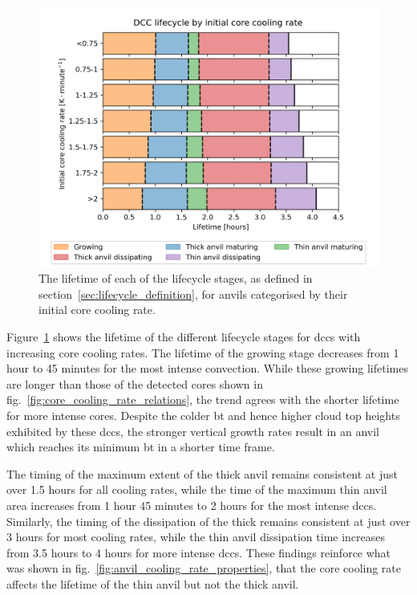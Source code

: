 \begin{figure}[tp]
    \centering
    \includegraphics[width=\textwidth]{figures/chapter3_09.png}
    \caption[
    The average lifetime of each lifecycle stage for anvils categorised by their initial core cooling rate
    ]{
    The lifetime of each of the lifecycle stages, as defined in section~\ref{sec:lifecycle_definition}, for anvils categorised by their initial core cooling rate.
    }
    \label{fig:anvil_cooling_rate_absolute_lifecycle}
\end{figure}

Figure~\ref{fig:anvil_cooling_rate_absolute_lifecycle} shows the lifetime of the different lifecycle stages for \acrshort{dcc}s with increasing core cooling rates.
The lifetime of the growing stage decreases from 1 hour to 45 minutes for the most intense convection.
While these growing lifetimes are longer than those of the detected cores shown in fig.~\ref{fig:core_cooling_rate_relations}, the trend agrees with the shorter lifetime for more intense cores.
Despite the colder \acrshort{bt} and hence higher cloud top heights exhibited by these \acrshort{dcc}s, the stronger vertical growth rates result in an anvil which reaches its minimum \acrshort{bt} in a shorter time frame.

The timing of the maximum extent of the thick anvil remains consistent at just over 1.5 hours for all cooling rates, while the time of the maximum thin anvil area increases from 1 hour 45 minutes to 2 hours for the most intense \acrshort{dcc}s.
Similarly, the timing of the dissipation of the thick remains consistent at just over 3 hours for most cooling rates, while the thin anvil dissipation time increases from 3.5 hours to 4 hours for more intense \acrshort{dcc}s.
These findings reinforce what was shown in fig.~\ref{fig:anvil_cooling_rate_properties}, that the core cooling rate affects the lifetime of the thin anvil but not the thick anvil.

